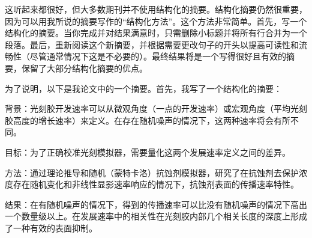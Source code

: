 这听起来都很好，但大多数期刊并不使用结构化的摘要。结构化摘要仍然很重要，因为可以用我所说的摘要写作的“结构化方法”。这个方法非常简单。首先，写一个结构化的摘要。当你完成并对结果满意时，只需删除小标题并将所有行合并为一个段落。最后，重新阅读这个新摘要，并根据需要更改句子的开头以提高可读性和流畅性（尽管通常情况下这是不必要的）。最终结果将是一个写得很好且有效的摘要，保留了大部分结构化摘要的优点。

为了说明，以下是我论文中的一个摘要。首先，我写了一个结构化的摘要：

背景：光刻胶开发速率可以从微观角度（一点的开发速率）或宏观角度（平均光刻胶高度的增长速率）来定义。在存在随机噪声的情况下，这两种速率将会有所不同。

目标：为了正确校准光刻模拟器，需要量化这两个发展速率定义之间的差异。

方法：通过理论推导和随机（蒙特卡洛）抗蚀剂模拟器，研究了在抗蚀剂去保护浓度存在随机变化和非线性显影速率响应的情况下，抗蚀剂表面的传播速率特性。

结果：在有随机噪声的情况下，得到的传播速率可以比没有随机噪声的情况下高出一个数量级以上。在发展速率中的相关性在光刻胶内部几个相关长度的深度上形成了一种有效的表面抑制。

